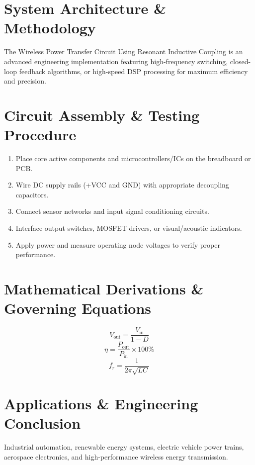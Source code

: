 \documentclass[11pt,a4paper]{article}
\begin{document}
\section{System Architecture \& Methodology}
The Wireless Power Transfer Circuit Using Resonant Inductive Coupling is an advanced engineering implementation featuring high-frequency switching, closed-loop feedback algorithms, or high-speed DSP processing for maximum efficiency and precision.

\section{Circuit Assembly \& Testing Procedure}
\begin{enumerate}
    \item Place core active components and microcontrollers/ICs on the breadboard or PCB.
    \item Wire DC supply rails (+VCC and GND) with appropriate decoupling capacitors.
    \item Connect sensor networks and input signal conditioning circuits.
    \item Interface output switches, MOSFET drivers, or visual/acoustic indicators.
    \item Apply power and measure operating node voltages to verify proper performance.
\end{enumerate}

\section{Mathematical Derivations \& Governing Equations}
\begin{equation}
V_{\text{out}} = \frac{V_{\text{in}}}{1 - D}
\end{equation}
\begin{equation}
\eta = \frac{P_{\text{out}}}{P_{\text{in}}} \times 100\%
\end{equation}
\begin{equation}
f_r = \frac{1}{2\pi \sqrt{L C}}
\end{equation}

\section{Applications \& Engineering Conclusion}
Industrial automation, renewable energy systems, electric vehicle power trains, aerospace electronics, and high-performance wireless energy transmission.
\end{document}
